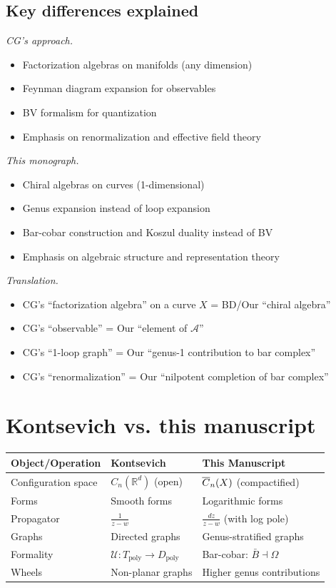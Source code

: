 \subsection{Key differences explained}

\emph{CG's approach.}
\begin{itemize}
\item Factorization algebras on manifolds (any dimension)
\item Feynman diagram expansion for observables
\item BV formalism for quantization
\item Emphasis on renormalization and effective field theory
\end{itemize}

\emph{This monograph.}
\begin{itemize}
\item Chiral algebras on curves (1-dimensional)
\item Genus expansion instead of loop expansion
\item Bar-cobar construction and Koszul duality instead of BV
\item Emphasis on algebraic structure and representation theory
\end{itemize}

\emph{Translation.}
\begin{itemize}
\item CG's ``factorization algebra'' on a curve $X$ = BD/Our ``chiral algebra''
\item CG's ``observable'' = Our ``element of $\mathcal{A}$''
\item CG's ``1-loop graph'' = Our ``genus-1 contribution to bar complex''
\item CG's ``renormalization'' = Our ``nilpotent completion of bar complex''
\end{itemize}

\section{Kontsevich vs. this manuscript}

\begin{center}
\begin{tabular}{|>{\raggedright\arraybackslash}p{5.8cm}|>{\raggedright\arraybackslash}p{3.9cm}|>{\raggedright\arraybackslash}p{3.9cm}|}
\hline
\textbf{Object/Operation} & \textbf{Kontsevich \cite{Kon99}} & \textbf{This Manuscript} \\
\hline
Configuration space & $C_n(\mathbb{R}^d)$ (open) & $\overline{C}_{n}(X)$ (compactified) \\
Forms & Smooth forms & Logarithmic forms \\
Propagator & $\frac{1}{z-w}$ & $\frac{dz}{z-w}$ (with log pole) \\
Graphs & Directed graphs & Genus-stratified graphs \\
Formality & $\mathcal{U}: T_{\text{poly}} \to D_{\text{poly}}$ & Bar-cobar: $\bar{B} \dashv \Omega$ \\
Wheels & Non-planar graphs & Higher genus contributions \\
\hline
\end{tabular}
\end{center}

